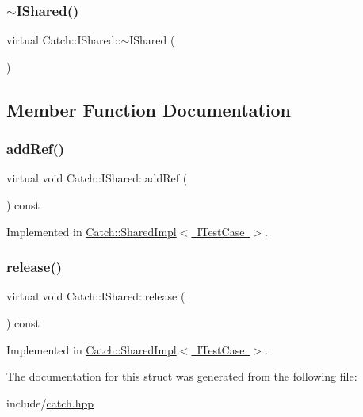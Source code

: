 \subsubsection{\texorpdfstring{$\sim$\+I\+Shared()}{~IShared()}}
{\footnotesize\ttfamily virtual Catch\+::\+I\+Shared\+::$\sim$\+I\+Shared (\begin{DoxyParamCaption}{ }\end{DoxyParamCaption})\hspace{0.3cm}{\ttfamily [virtual]}}



\subsection{Member Function Documentation}
\mbox{\label{struct_catch_1_1_i_shared_ae383df68557cdaf0910b411af04d9e33}} 
\subsubsection{\texorpdfstring{add\+Ref()}{addRef()}}
{\footnotesize\ttfamily virtual void Catch\+::\+I\+Shared\+::add\+Ref (\begin{DoxyParamCaption}{ }\end{DoxyParamCaption}) const\hspace{0.3cm}{\ttfamily [pure virtual]}}



Implemented in \mbox{\hyperlink{struct_catch_1_1_shared_impl_a5d1a4c96e8fc07c821890fd09749062e}{Catch\+::\+Shared\+Impl$<$ I\+Test\+Case $>$}}.

\mbox{\label{struct_catch_1_1_i_shared_a002f52624728a763956fb6f230cb2f57}} 
\subsubsection{\texorpdfstring{release()}{release()}}
{\footnotesize\ttfamily virtual void Catch\+::\+I\+Shared\+::release (\begin{DoxyParamCaption}{ }\end{DoxyParamCaption}) const\hspace{0.3cm}{\ttfamily [pure virtual]}}



Implemented in \mbox{\hyperlink{struct_catch_1_1_shared_impl_ada8052c6f24fd73ec099333626f106fe}{Catch\+::\+Shared\+Impl$<$ I\+Test\+Case $>$}}.



The documentation for this struct was generated from the following file\+:\begin{DoxyCompactItemize}
\item 
include/\mbox{\hyperlink{catch_8hpp}{catch.\+hpp}}\end{DoxyCompactItemize}

